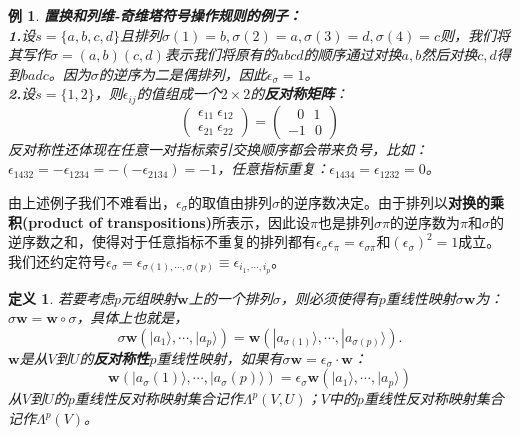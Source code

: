 \documentclass[mathserif,hyperref,UTF8,openany,b5paper]{ctexbook}
\newtheorem{exmp}{例}[section]
\newtheorem{defn}{定义}[section]
\begin{document}
\begin{exmp}\textbf{置换和列维-奇维塔符号操作规则的例子：}\\
\textbf{1.}设$s=\{a,b,c,d\}$且排列$\sigma(1)=b,\sigma(2)=a,\sigma(3)=d,\sigma(4)=c$则，我们将其写作$\sigma=(a,b)(c,d)$表示我们将原有的$abcd$的顺序通过对换$a,b$然后对换$c,d$得到$badc$。因为$\sigma$的逆序为二是偶排列，因此$\epsilon_\sigma=1$。\\
\textbf{2.}设$s=\{1,2\}$，则$\epsilon_{ij}$的值组成一个$2\times 2$的\textbf{反对称矩阵}：
\begin{equation}
\begin{pmatrix}
           \epsilon_{11}\ \epsilon_{12} \\
           \epsilon_{21}\ \epsilon_{22}
         \end{pmatrix} = \begin{pmatrix}
           \ \ \ 0\ \ \ 1 \\
           -1\ \ \ 0
         \end{pmatrix}
\end{equation}反对称性还体现在任意一对指标索引交换顺序都会带来负号，比如：$\epsilon_{1432}=-\epsilon_{1234}=-(-\epsilon_{2134})=-1$，任意指标重复：$\epsilon_{1434}=\epsilon_{1232}=0$。
\end{exmp}

由上述例子我们不难看出，$\epsilon_\sigma$的取值由排列$\sigma$的逆序数决定。由于排列以\textbf{对换的乘积(product of transpositions)}所表示，因此设$\pi$也是排列$\sigma\pi$的逆序数为$\pi$和$\sigma$的逆序数之和，使得对于任意指标不重复的排列都有$\epsilon_\sigma\epsilon_\pi=\epsilon_{\sigma\pi}$和$(\epsilon_\sigma)^2=1$成立。我们还约定符号$\epsilon _\sigma=\epsilon_{\sigma(1),\cdots,\sigma(p)}\equiv\epsilon_{i_1,\cdots,i_p}$。
\begin{defn}
若要考虑$p$元组映射$\mathbf{w}$上的一个排列$\sigma$，则必须使得有$p$重线性映射$\sigma\mathbf{w}$为：$\boxed{\sigma\mathbf{w}=\mathbf{w}\circ \sigma}$，具体上也就是，\begin{equation}
\sigma\mathbf{w}(|a_1\rangle,\cdots,|a_p\rangle)=\mathbf{w}(|a_{\sigma(1)}\rangle,\cdots,|a_{\sigma(p)}\rangle).
\end{equation}
$\mathbf{w}$是从$V$到$U$的\textbf{反对称性}$p$重线性映射，如果有$\boxed{\sigma\mathbf{w}=\epsilon_{\sigma}\cdot\mathbf{w}}$：
\begin{equation}
\mathbf{w}(|a_\sigma(1)\rangle,\cdots,|a_\sigma(p)\rangle)=\epsilon_{\sigma}\mathbf{w}(|a_1\rangle,\cdots,|a_p\rangle)
\end{equation}从$V$到$U$的$p$重线性反对称映射集合记作$\Lambda^p(V,U)$；$V$中的$p$重线性反对称映射集合记作$\Lambda^p(V)$。
\end{defn}
\end{document}
